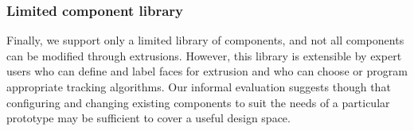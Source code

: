     \subsubsection{Limited component library}
    Finally, we support only a limited library of components, and not all components can be modified through extrusions. However, this library is extensible by expert users who can define and label faces for extrusion and who can choose or program appropriate tracking algorithms. Our informal evaluation suggests though that configuring and changing existing components to suit the needs of a particular prototype may be sufficient to cover a useful design space.